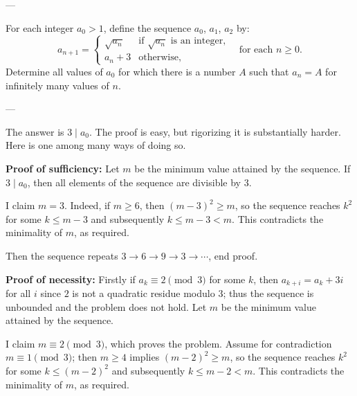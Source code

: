 
---

For each integer $a_0>1$, define the sequence $a_0$, $a_1$, $a_2$ by: \[a_{n+1}=\begin{cases}
        \sqrt{a_n}&\text{if $\sqrt{a_n}$ is an integer,}\\
        a_n+3&\text{otherwise,}
    \end{cases}\quad\text{for each $n\ge0$.}
\]
Determine all values of $a_0$ for which there is a number $A$ such that $a_n=A$ for infinitely many values of $n$.

---

The answer is $3\mid a_0$. The proof is easy, but rigorizing it is substantially harder. Here is one among many ways of doing so.

\bigskip

\textbf{Proof of sufficiency:} Let $m$ be the minimum value attained by the sequence. If $3\mid a_0$, then all elements of the sequence are divisible by $3$.

I claim $m=3$. Indeed, if $m\ge6$, then $(m-3)^2\ge m$, so the sequence reaches $k^2$ for some $k\le m-3$ and subsequently $k\le m-3<m$. This contradicts the minimality of $m$, as required.

Then the sequence repeats $3\to6\to9\to3\to\cdots$, end proof.

\bigskip

\textbf{Proof of necessity:} Firstly if $a_k\equiv2\pmod3$ for some $k$, then $a_{k+i}=a_k+3i$ for all $i$ since $2$ is not a quadratic residue modulo $3$; thus the sequence is unbounded and the problem does not hold. Let $m$ be the minimum value attained by the sequence.

I claim $m\equiv2\pmod3$, which proves the problem. Assume for contradiction $m\equiv1\pmod3$; then $m\ge4$ implies $(m-2)^2\ge m$, so the sequence reaches $k^2$ for some $k\le(m-2)^2$ and subsequently $k\le m-2<m$. This contradicts the minimality of $m$, as required.


